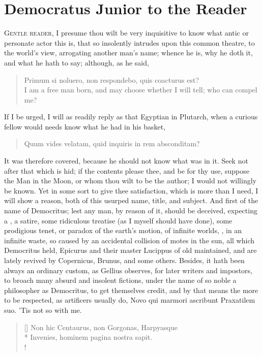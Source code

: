 \chapter{Democratus Junior to the Reader}
{\lettrine[image,lines=5,findent=5pt,nindent=0pt]{G}{entle reader}, I presume thou wilt be very inquisitive to know what
antic or personate actor this is, that so insolently intrudes upon this
common theatre, to the world's view, arrogating another man's name;
whence he is, why he doth it, and what he hath to say; although, as
he said,

\begin{quote}
\textlatin{Primum si noluero, non respondebo, quis coacturus est?}\\
I am a free man born, and may choose whether I will tell; who can compel me?
\end{quote}
If I be urged, I will as readily reply as that Egyptian in Plutarch,
when a curious fellow would needs know what he had in his basket,
\begin{quote}
\textlatin{Quum vides velatam, quid inquiris in rem absconditam?}
\end{quote}
It was therefore covered, because he should not know what was in it. Seek not after that
which is hid; if the contents please thee, and be for thy use,
suppose the Man in the Moon, or whom thou wilt to be the author; I
would not willingly be known. Yet in some sort to give thee
satisfaction, which is more than I need, I will show a reason, both of
this usurped name, title, and subject. And first of the name of
Democritus; lest any man, by reason of it, should be deceived,
expecting a , a satire, some ridiculous treatise (as I myself
should have done), some prodigious tenet, or paradox of the earth's
motion, of infinite worlds, , in an infinite waste, so caused by an accidental collision
of motes in the sun, all which Democritus held, Epicurus and their
master Lucippus of old maintained, and are lately revived by
Copernicus, Brunus, and some others. Besides, it hath been always an
ordinary custom, as Gellius observes, for later writers and
impostors, to broach many absurd and insolent fictions, under the name
of so noble a philosopher as Democritus, to get themselves credit, and
by that means the more to be respected, as artificers usually do,
\textlatin{Novo qui marmori ascribunt Praxatilem suo}. 'Tis not so with me.
\settowidth{\versewidth}{Non hic Centaurus, non Gorgonas, Harpyasque}
\begin{verse}[\versewidth]
\textlatin{Non hic Centaurus, non Gorgonas, Harpyasque}\\*
\textlatin{Invenies, hominem pagina nostra sapit.}\\!


\end{verse}}

